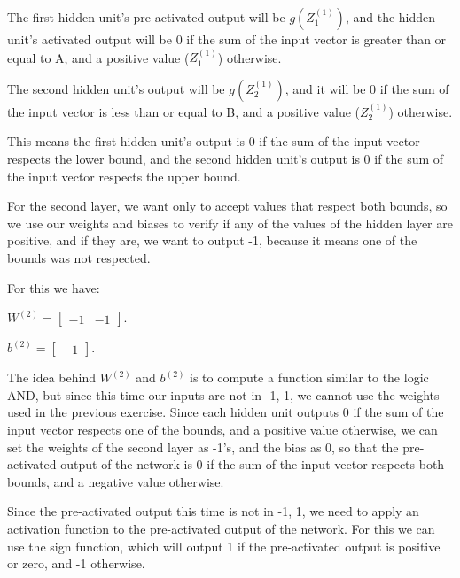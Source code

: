 \documentclass{article}
\begin{document}
\bigskip

The first hidden unit's pre-activated output will be $g(Z_1^{(1)})$, and the hidden unit's activated output 
will be 0 if the sum of the input vector is greater than or equal to A, and a positive value ($Z_1^{(1)}$) otherwise.

The second hidden unit's output will be $g(Z_2^{(1)})$, and it will be 0 if the sum of the input vector is less than or equal to B, 
and a positive value ($Z_2^{(1)}$) otherwise.

This means the first hidden unit's output is 0 if the sum of the input vector respects the lower bound, 
and the second hidden unit's output is 0 if the sum of the input vector respects the upper bound.

\bigskip

For the second layer, we want only to accept values that respect both bounds, so we use our weights and biases to verify if any of the values
of the hidden layer are positive, and if they are, we want to output -1, because it means one of the bounds was not respected.

\bigskip

For this we have:

\bigskip

\( W^{(2)} = \begin{bmatrix}
    -1 & -1
\end{bmatrix}
\).

\bigskip

\(b^{(2)} = \begin{bmatrix}
    -1
\end{bmatrix}
\).

\bigskip

The idea behind \(W^{(2)}\) and \(b^{(2)}\) is to compute a function similar to the logic AND, but since this time our inputs are not in 
{-1, 1}, we cannot use the weights used in the previous exercise.
Since each hidden unit outputs 0 if the sum of the input vector respects one of the bounds, and a positive value otherwise, we can set the 
weights of the second layer as -1's, and the bias as 0, so that the pre-activated output of the network is 0 if the sum of the input vector 
respects both bounds, and a negative value otherwise.

\bigskip

Since the pre-activated output this time is not in {-1, 1}, we need to apply an activation function to the pre-activated output of the network. 
For this we can use the sign function, which will output 1 if the pre-activated output is positive or zero, and -1 otherwise.
\end{document}
